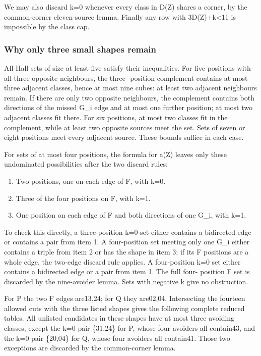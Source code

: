 \documentclass[
  10pt,
]{article}
\providecommand{\tightlist}{%
  \setlength{\itemsep}{0pt}\setlength{\parskip}{0pt}}
\begin{document}
We may also discard k=0 whenever every class in D(Z) shares a corner, by
the common-corner eleven-source lemma. Finally any row with
3\textbar D(Z)\textbar+k\textless11 is impossible by the class cap.

\hypertarget{why-only-three-small-shapes-remain}{%
\subsubsection*{Why only three small shapes
remain}\label{why-only-three-small-shapes-remain}}

All Hall sets of size at least five satisfy their inequalities. For five
positions with all three opposite neighbours, the three- position
complement contains at most three adjacent classes, hence at most nine
cubes: at least two adjacent neighbours remain. If there are only two
opposite neighbours, the complement contains both directions of the
missed G\_i edge and at most one further position; at most two adjacent
classes fit there. For six positions, at most two classes fit in the
complement, while at least two opposite sources meet the set. Sets of
seven or eight positions meet every adjacent source. These bounds
suffice in each case.

For sets of at most four positions, the formula for a(Z) leaves only
these undominated possibilities after the two discard rules:

\begin{enumerate}
\def\labelenumi{\arabic{enumi}.}
\tightlist
\item
  Two positions, one on each edge of F, with k=0.
\item
  Three of the four positions on F, with k=1.
\item
  One position on each edge of F and both directions of one G\_i, with
  k=1.
\end{enumerate}

To check this directly, a three-position k=0 set either contains a
bidirected edge or contains a pair from item 1. A four-position set
meeting only one G\_i either contains a triple from item 2 or has the
shape in item 3; if its F positions are a whole edge, the two-edge
discard rule applies. A four-position k=0 set either contains a
bidirected edge or a pair from item 1. The full four- position F set is
discarded by the nine-avoider lemma. Sets with negative k give no
obstruction.

For P the two F edges are13,24; for Q they are02,04. Intersecting the
fourteen allowed cuts with the three listed shapes gives the following
complete reduced tables. All unlisted candidates in these shapes have at
most three avoiding classes, except the k=0 pair \{31,24\} for P, whose
four avoiders all contain43, and the k=0 pair \{20,04\} for Q, whose
four avoiders all contain41. Those two exceptions are discarded by the
common-corner lemma.
\end{document}

